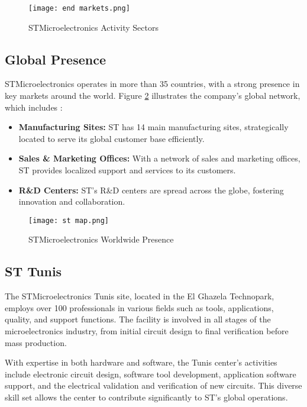 \begin{figure}[H]
  \centering
  \texttt{[image: end markets.png]}
  \caption{STMicroelectronics Activity Sectors}
  \label{fig:st_activities}
\end{figure}

\subsection{Global Presence}

STMicroelectronics operates in more than 35 countries, with a strong presence in key markets around the world. Figure \ref{fig:map} illustrates the company's global network, which includes \cite{st_comp}:

\begin{itemize}
    \item \textbf{Manufacturing Sites:} ST has 14 main manufacturing sites, strategically located to serve its global customer base efficiently.
    \item \textbf{Sales \& Marketing Offices:} With a network of sales and marketing offices, ST provides localized support and services to its customers.
    \item \textbf{R\&D Centers:} ST's R\&D centers are spread across the globe, fostering innovation and collaboration.
\end{itemize}

\begin{figure}[H]
  \centering
  \texttt{[image: st map.png]}
  \caption{STMicroelectronics Worldwide Presence}
  \label{fig:map}
\end{figure}

\subsection{ST Tunis}

The STMicroelectronics Tunis site, located in the El Ghazela Technopark, employs over 100 professionals in various fields such as tools, applications, quality, and support functions. The facility is involved in all stages of the microelectronics industry, from initial circuit design to final verification before mass production.

With expertise in both hardware and software, the Tunis center's activities include electronic circuit design, software tool development, application software support, and the electrical validation and verification of new circuits. This diverse skill set allows the center to contribute significantly to ST's global operations.


